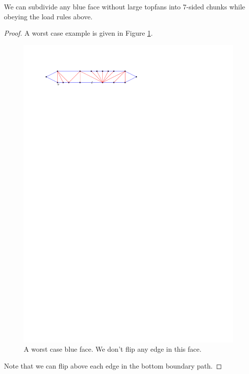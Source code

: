 \begin{lemma}
  \label{lm:}
  We can subdivide any blue face without large topfans into 7-sided chunks while obeying the load rules above.
\end{lemma}

\begin{proof}
  A worst case example is given in Figure \ref{fig:subdiv:worstCase}.

  \begin{figure}[h]
    \centering
    \includegraphics[scale=1]{blueFaceSubdivision/img/worstCase}
    \caption{A worst case blue face. We don't flip any edge in this face.}
    \label{fig:subdiv:worstCase}
  \end{figure}

  Note that we can flip above each edge in the bottom boundary path.


\end{proof}
